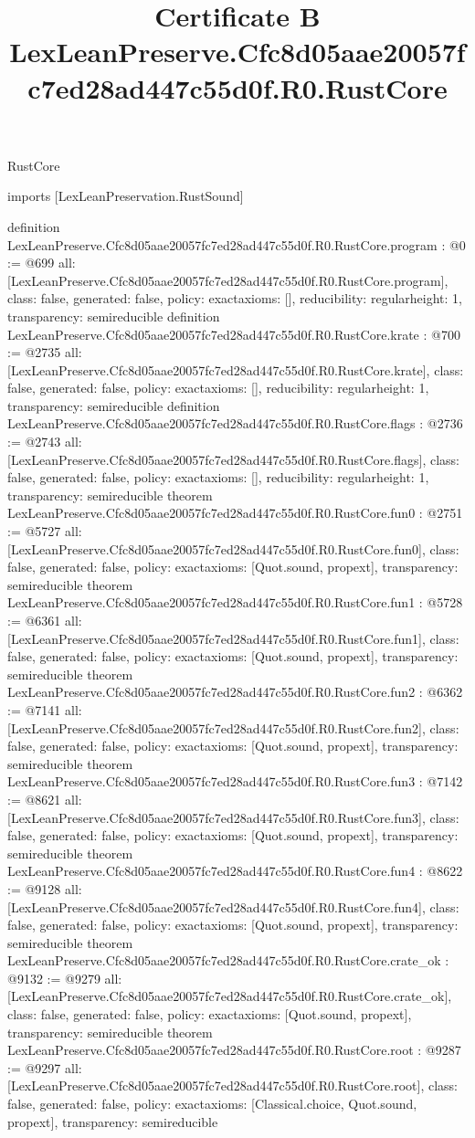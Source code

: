 \begin{lexlean}{RustCore}
\title{Certificate B LexLeanPreserve.Cfc8d05aae20057fc7ed28ad447c55d0f.R0.RustCore}
\begin{coremodule}
imports [LexLeanPreservation.RustSound]

definition LexLeanPreserve.Cfc8d05aae20057fc7ed28ad447c55d0f.R0.RustCore.program : @0 := @699 {
  all: [LexLeanPreserve.Cfc8d05aae20057fc7ed28ad447c55d0f.R0.RustCore.program],
  class: false,
  generated: false,
  policy: exact{axioms: []},
  reducibility: regular{height: 1},
  transparency: semireducible
}
definition LexLeanPreserve.Cfc8d05aae20057fc7ed28ad447c55d0f.R0.RustCore.krate : @700 := @2735 {
  all: [LexLeanPreserve.Cfc8d05aae20057fc7ed28ad447c55d0f.R0.RustCore.krate],
  class: false,
  generated: false,
  policy: exact{axioms: []},
  reducibility: regular{height: 1},
  transparency: semireducible
}
definition LexLeanPreserve.Cfc8d05aae20057fc7ed28ad447c55d0f.R0.RustCore.flags : @2736 := @2743 {
  all: [LexLeanPreserve.Cfc8d05aae20057fc7ed28ad447c55d0f.R0.RustCore.flags],
  class: false,
  generated: false,
  policy: exact{axioms: []},
  reducibility: regular{height: 1},
  transparency: semireducible
}
theorem LexLeanPreserve.Cfc8d05aae20057fc7ed28ad447c55d0f.R0.RustCore.fun0 : @2751 := @5727 {
  all: [LexLeanPreserve.Cfc8d05aae20057fc7ed28ad447c55d0f.R0.RustCore.fun0],
  class: false,
  generated: false,
  policy: exact{axioms: [Quot.sound, propext]},
  transparency: semireducible
}
theorem LexLeanPreserve.Cfc8d05aae20057fc7ed28ad447c55d0f.R0.RustCore.fun1 : @5728 := @6361 {
  all: [LexLeanPreserve.Cfc8d05aae20057fc7ed28ad447c55d0f.R0.RustCore.fun1],
  class: false,
  generated: false,
  policy: exact{axioms: [Quot.sound, propext]},
  transparency: semireducible
}
theorem LexLeanPreserve.Cfc8d05aae20057fc7ed28ad447c55d0f.R0.RustCore.fun2 : @6362 := @7141 {
  all: [LexLeanPreserve.Cfc8d05aae20057fc7ed28ad447c55d0f.R0.RustCore.fun2],
  class: false,
  generated: false,
  policy: exact{axioms: [Quot.sound, propext]},
  transparency: semireducible
}
theorem LexLeanPreserve.Cfc8d05aae20057fc7ed28ad447c55d0f.R0.RustCore.fun3 : @7142 := @8621 {
  all: [LexLeanPreserve.Cfc8d05aae20057fc7ed28ad447c55d0f.R0.RustCore.fun3],
  class: false,
  generated: false,
  policy: exact{axioms: [Quot.sound, propext]},
  transparency: semireducible
}
theorem LexLeanPreserve.Cfc8d05aae20057fc7ed28ad447c55d0f.R0.RustCore.fun4 : @8622 := @9128 {
  all: [LexLeanPreserve.Cfc8d05aae20057fc7ed28ad447c55d0f.R0.RustCore.fun4],
  class: false,
  generated: false,
  policy: exact{axioms: [Quot.sound, propext]},
  transparency: semireducible
}
theorem LexLeanPreserve.Cfc8d05aae20057fc7ed28ad447c55d0f.R0.RustCore.crate_ok : @9132 := @9279 {
  all: [LexLeanPreserve.Cfc8d05aae20057fc7ed28ad447c55d0f.R0.RustCore.crate_ok],
  class: false,
  generated: false,
  policy: exact{axioms: [Quot.sound, propext]},
  transparency: semireducible
}
theorem LexLeanPreserve.Cfc8d05aae20057fc7ed28ad447c55d0f.R0.RustCore.root : @9287 := @9297 {
  all: [LexLeanPreserve.Cfc8d05aae20057fc7ed28ad447c55d0f.R0.RustCore.root],
  class: false,
  generated: false,
  policy: exact{axioms: [Classical.choice, Quot.sound, propext]},
  transparency: semireducible
}


\end{coremodule}
\end{lexlean}
